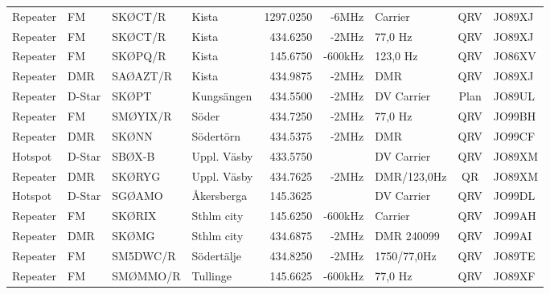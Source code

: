 \documentclass[10pt,swedish,a4paper,twoside]{article}
\begin{document}
\begin{landscape}
\begin{longtable}{llllrrlcl}
	Repeater          & FM           & SKØCT/R       & Kista        &         1297.0250 &          -6MHz & Carrier         &       QRV       & JO89XJ           \\
	Repeater          & FM           & SKØCT/R       & Kista        &          434.6250 &          -2MHz & 77,0 Hz         &       QRV       & JO89XJ           \\
	Repeater          & FM           & SKØPQ/R       & Kista        &          145.6750 &        -600kHz & 123,0 Hz        &       QRV       & JO86XV           \\
	Repeater          & DMR          & SAØAZT/R      & Kista        &          434.9875 &          -2MHz & DMR             &       QRV       & JO89XJ           \\
	Repeater          & D-Star       & SKØPT         & Kungsängen   &          434.5500 &          -2MHz & DV Carrier      &      Plan       & JO89UL           \\
	Repeater          & FM           & SMØYIX/R      & Söder        &          434.7250 &          -2MHz & 77,0 Hz         &       QRV       & JO99BH           \\
	Repeater          & DMR          & SKØNN         & Södertörn    &          434.5375 &          -2MHz & DMR             &       QRV       & JO99CF           \\
	Hotspot           & D-Star       & SBØX-B        & Uppl. Väsby  &          433.5750 &                & DV Carrier      &       QRV       & JO89XM           \\
	Repeater          & DMR          & SKØRYG        & Uppl. Väsby  &          434.7625 &          -2MHz & DMR/123,0Hz    &       QR        & JO89XM           \\
	Hotspot           & D-Star       & SGØAMO        & Åkersberga   &          145.3625 &                & DV Carrier      &       QRV       & JO99DL           \\
	Repeater          & FM           & SKØRIX        & Sthlm city   &          145.6250 &        -600kHz & Carrier         &       QRV       & JO99AH           \\
	Repeater          & DMR          & SKØMG         & Sthlm city   &          434.6875 &          -2MHz & DMR 240099      &       QRV       & JO99AI           \\
	Repeater          & FM           & SM5DWC/R      & Södertälje   &          434.8250 &          -2MHz & 1750/77,0Hz    &       QRV       & JO89TE           \\
	Repeater          & FM           & SMØMMO/R      & Tullinge     &          145.6625 &        -600kHz & 77,0 Hz         &       QRV       & JO89XF           \\

\end{longtable}
\end{landscape}
\end{document}
